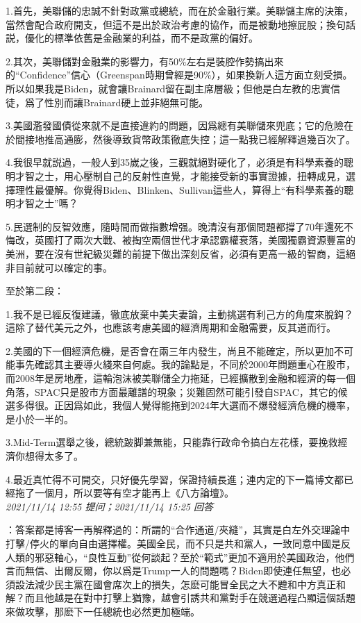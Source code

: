 \documentclass[twocolumn]{ctexart}
\begin{document}
1.首先，美聯儲的忠誠不針對政黨或總統，而在於金融行業。美聯儲主席的決策，當然會配合政府開支，但這不是出於政治考慮的協作，而是被動地擦屁股；換句話説，優化的標準依舊是金融業的利益，而不是政黨的偏好。

2.其次，美聯儲對金融業的影響力，有50\%左右是裝腔作勢搞出來的“Confidence”信心（Greenspan時期曾經是90\%），如果換新人這方面立刻受損。所以如果我是Biden，就會讓Brainard留在副主席層級；但他是白左教的忠實信徒，爲了性別而讓Brainard硬上並非絕無可能。

3.美國濫發國債從來就不是直接違約的問題，因爲總有美聯儲來兜底；它的危險在於間接地推高通膨，然後導致貨幣政策徹底失控；這一點我已經解釋過幾百次了。

4.我很早就説過，一般人到35嵗之後，三觀就絕對硬化了，必須是有科學素養的聰明才智之士，用心壓制自己的反射性直覺，才能接受新的事實證據，扭轉成見，選擇理性最優解。你覺得Biden、Blinken、Sullivan這些人，算得上“有科學素養的聰明才智之士”嗎？

5.民選制的反智效應，隨時間而做指數增强。晚清沒有那個問題都撐了70年還死不悔改，英國打了兩次大戰、被掏空兩個世代才承認霸權衰落，美國獨霸資源豐富的美洲，要在沒有世紀級災難的前提下做出深刻反省，必須有更高一級的智商，這絕非目前就可以確定的事。

至於第二段：

1.我不是已經反復建議，徹底放棄中美夫妻論，主動挑選有利己方的角度來脫鈎？這除了替代美元之外，也應該考慮美國的經濟周期和金融需要，反其道而行。

2.美國的下一個經濟危機，是否會在兩三年内發生，尚且不能確定，所以更加不可能事先確認其主要導火綫來自何處。我的論點是，不同於2000年問題重心在股市，而2008年是房地產，這輪泡沫被美聯儲全力拖延，已經擴散到金融和經濟的每一個角落，SPAC只是股市方面最離譜的現象；災難固然可能引發自SPAC，其它的候選多得很。正因爲如此，我個人覺得能拖到2024年大選而不爆發經濟危機的機率，是小於一半的。

3.Mid-Term選舉之後，總統跛脚兼無能，只能靠行政命令搞白左花樣，要挽救經濟你想得太多了。

4.最近真忙得不可開交，只好優先學習，保證持續長進；連内定的下一篇博文都已經拖了一個月，所以要等有空才能再上《八方論壇》。
\\

\textit{\hfill\noindent\small 2021/11/14 12:55 提问；2021/11/14 15:25 回答}

：答案都是博客一再解釋過的：所謂的“合作通道/夾縫”，其實是白左外交理論中打擊/停火的單向自由選擇權。美國全民，而不只是共和黨人，一致同意中國是反人類的邪惡軸心，“良性互動”從何談起？至於“範式”更加不適用於美國政治，他們言而無信、出爾反爾，你以爲是Trump一人的問題嗎？Biden即使連任無望，也必須設法減少民主黨在國會席次上的損失，怎麽可能冒全民之大不韙和中方真正和解？而且他越是在對中打擊上猶豫，越會引誘共和黨對手在競選過程凸顯這個話題來做攻擊，那麽下一任總統也必然更加極端。
\end{document}
